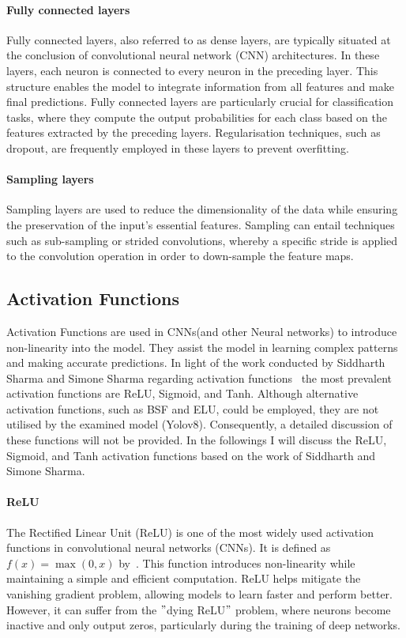 \paragraph{Fully connected layers}\label{par:fully-connected-layers}

Fully connected layers, also referred to as dense layers, are typically situated at
the conclusion of convolutional neural network (CNN) architectures.
In these layers, each neuron is connected to every neuron in the preceding layer.
This structure enables the model to integrate information from all features and make final predictions.
Fully connected layers are particularly crucial for classification tasks,
where they compute the output probabilities for each class based on the features extracted by the preceding layers.
Regularisation techniques, such as dropout, are frequently employed in these layers to prevent overfitting.

\paragraph{Sampling layers}\label{par:sampling-layers}

Sampling layers are used to reduce the dimensionality of the data while ensuring the preservation of the input's essential features.
Sampling can entail techniques such as sub-sampling or strided convolutions,
whereby a specific stride is applied to the convolution operation in order to down-sample the feature maps.


\subsection{Activation Functions}\label{subsec:activation-functions}
Activation Functions are used in CNNs(and other Neural networks) to introduce non-linearity into the model.
They assist the model in learning complex patterns and making accurate predictions.
 In light of the work conducted by Siddharth Sharma and Simone Sharma regarding  activation functions~\cite{sharma2017activation}
the most prevalent  activation functions are ReLU, Sigmoid, and Tanh.
Although alternative activation functions, such as BSF and ELU, could be employed, they are not utilised by the examined model (Yolov8).
Consequently, a detailed discussion of these functions will not be provided.
In the followings I will discuss the ReLU, Sigmoid, and Tanh activation functions based on the work of Siddharth and Simone Sharma\cite{sharma2017activation}.

\paragraph{ReLU}\label{par:relu}
The Rectified Linear Unit (ReLU) is one of the most widely used activation functions in convolutional neural networks (CNNs).
It is defined as \( f(x) = \max(0, x) \) by~\cite{sharma2017activation}.
This function introduces non-linearity while maintaining a simple and efficient computation.
ReLU helps mitigate the vanishing gradient problem, allowing models to learn faster and perform better.
However, it can suffer from the \("\)dying ReLU\("\) problem, where neurons become inactive and only output zeros,
particularly during the training of deep networks.

